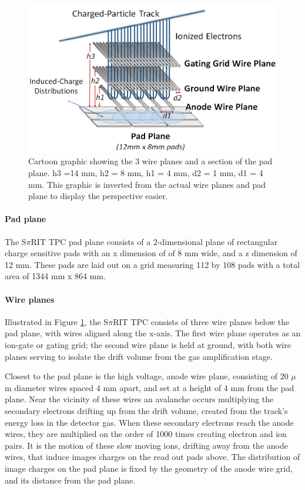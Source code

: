 \documentclass[review]{elsarticle}
\begin{document}
\begin{figure}[H]
\includegraphics[width=\linewidth]{padwire}
\caption{Cartoon graphic showing the 3 wire planes and a section of the pad plane. h3 =14 mm, h2 = 8 mm, h1 = 4 mm, d2 = 1 mm, d1 = 4 mm. This graphic is inverted from the actual wire planes and pad plane to display the perspective easier.}
\label{fig:padwire}
\end{figure}

\paragraph{Pad plane} 
The S$\pi$RIT TPC pad plane consists of a 2-dimensional plane of rectangular charge sensitive pads with an x dimension of of 8 mm wide, and a z dimension of 12 mm. These pads are laid out on a grid measuring 112 by 108 pads with a total area of 1344 mm x 864 mm.

\paragraph{Wire planes}
Illustrated in Figure \ref{fig:padwire}, the S$\pi$RIT TPC consists of three wire planes below the pad plane, with wires aligned along the x-axis. The first wire plane operates as an ion-gate or gating grid; the second wire plane is held at ground, with both wire planes serving to isolate the drift volume from the gas amplification stage. 

Closest to the pad plane is the high voltage, anode wire plane, consisting of 20 $\mu$m diameter wires spaced 4 mm apart, and set at a height of 4 mm from the pad plane. Near the vicinity of these wires an avalanche occurs multiplying the secondary electrons drifting up from the drift volume, created from the track's energy loss in the detector gas. When these secondary electrons reach the anode wires, they are multiplied on the order of 1000 times creating electron and ion pairs. It is the motion of these slow moving ions, drifting away from the anode wires, that induce images charges on the read out pads above. The distribution of image charges on the pad plane is fixed by the geometry of the anode wire grid, and its distance from the pad plane. 
\end{document}

